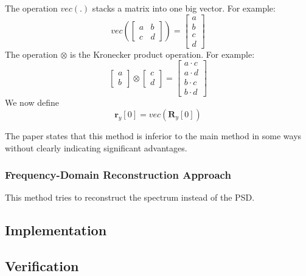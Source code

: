 \documentclass[report, oneside, a4paper, openany]{memoir}
\begin{document}
The operation $vec(.)$ stacks a matrix into one big vector. For example:
$$
vec(\begin{bmatrix}
a & b \\
c & d
\end{bmatrix})
= 
\begin{bmatrix}
a \\ b \\ c \\ d
\end{bmatrix}
$$ 
The operation $\otimes$ is the Kronecker product operation. For example:
$$
\begin{bmatrix}
a \\ b
\end{bmatrix} \otimes
\begin{bmatrix}
c \\ d
\end{bmatrix} = 
\begin{bmatrix}
a\cdot c \\ a\cdot d \\b\cdot c \\ b\cdot d
\end{bmatrix}
$$ 
We now define
$$
\mathbf{r}_y[0] = vec(\mathbf{R}_y[0])
$$

The paper states that this method is inferior to the main method in some ways without clearly indicating significant advantages.

\subsubsection{Frequency-Domain Reconstruction Approach}
This method tries to reconstruct the spectrum instead of the PSD.

\subsection{Implementation}

\subsection{Verification}
\end{document}
